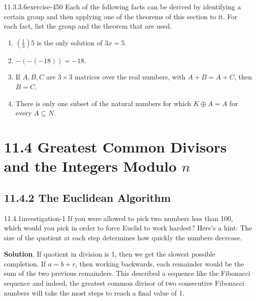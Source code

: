 \documentclass[twoside,10pt,]{book}
\numberwithin{equation}{section}
\begin{document}
\begin{divisionsolution}{11.3.3.6}{}{exercise-450}%
\hypertarget{p-3953}{}%
Each of the following facts can be derived by identifying a certain group and then applying one of the theorems of this section to it. For each fact, list the group and the theorem that are used.\leavevmode%
\begin{enumerate}[label=(\alph*)]
\item\hypertarget{li-1795}{}\hypertarget{p-3954}{}%
\(\left(\frac{1}{3}\right)5\) is the only solution of \(3x = 5\).%
\item\hypertarget{li-1796}{}\hypertarget{p-3955}{}%
\(-(-(-18)) = -18\).%
\item\hypertarget{li-1797}{}\hypertarget{p-3956}{}%
If \(A, B, C\) are \(3\times 3\) matrices over the real numbers, with \(A + B = A + C\), then \(B = C\).%
\item\hypertarget{li-1798}{}\hypertarget{p-3957}{}%
There is only one subset of the natural numbers for which \(K \oplus  A = A\) for every \(A \subseteq N\).%
\end{enumerate}
%
\end{divisionsolution}%
\section*{11.4 Greatest Common Divisors  and the Integers Modulo \(n\)}
\subsection*{11.4.2 The Euclidean Algorithm}
\begin{investigationsolution}{11.4.1}{}{investigation-1}%
\hypertarget{p-3981}{}%
If you were allowed to pick two numbers less than 100, which would you pick in order to force Euclid to work hardest? Here's a hint:  The size of the quotient at each step determines how quickly the numbers decrease.%
\par\smallskip%
\noindent\textbf{Solution}.\quad%
\hypertarget{p-3982}{}%
If quotient in division is 1, then we get the slowest possible completion.   If \(a = b + r\), then working backwards, each remainder would be the sum of the two previous remainders.  This described a sequence like the Fibonacci sequence and indeed, the greatest common divisor of two consecutive Fibonacci numbers will take the most steps to reach a final value of 1.%
\end{investigationsolution}%
\end{document}
